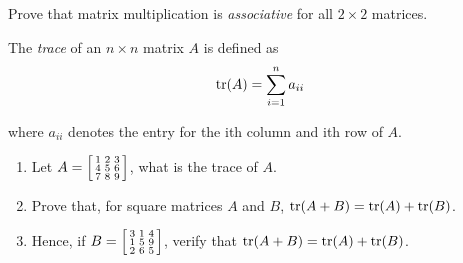 \begin{problem}[1]
  Prove that matrix multiplication is \textit{associative} for all \(2\times 2\) matrices.
\end{problem}
\begin{problem}[1]
  The \textit{trace} of an \(n\times n\) matrix \(A\) is defined as 
  \begin{equation}
    \trace(A)=\sum_{i=1}^{n} a_{ii}
  \end{equation}


  where \(a_{ii}\) denotes the entry for the ith column and ith row of \(A\).
  \begin{enumerate}[label=\alph*)]
    \item{Let \(A=\begin{bsmallmatrix}
        1 & 2 & 3 \\
        4 & 5 & 6 \\
        7 & 8 & 9
    \end{bsmallmatrix} \), what is the trace of \(A\).}
  \item{Prove that, for square matrices \(A\) and \(B\), \(\trace(A+B)=\trace(A)+\trace(B)\).}
  \item{Hence, if \(B=\begin{bsmallmatrix}
      3 & 1 & 4 \\
      1 & 5 & 9 \\
      2 & 6 & 5
  \end{bsmallmatrix}\), verify that \(\trace(A+B)=\trace(A)+\trace(B)\).}
  \end{enumerate}
\end{problem}
